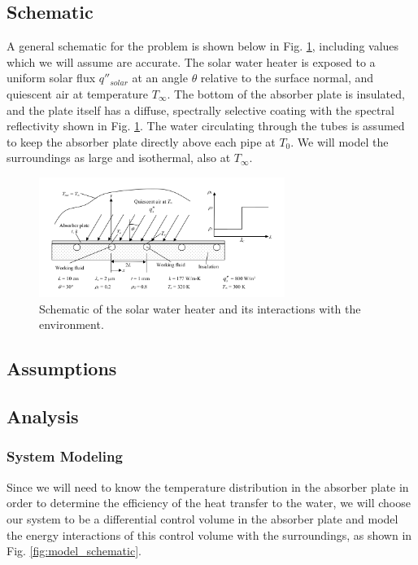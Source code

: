 \documentclass[]{report}
\begin{document}
\subsection{Schematic}

A general schematic for the problem is shown below in Fig. \ref{fig:base_schematic}, including values which we will assume are accurate. The solar water heater is exposed to a uniform solar flux $q''_{solar}$ at an angle $\theta$ relative to the surface normal, and quiescent air at temperature $T_{\infty}$. The bottom of the absorber plate is insulated, and the plate itself has a diffuse, spectrally selective coating with the spectral reflectivity shown in Fig. \ref{fig:base_schematic}. The water circulating through the tubes is assumed to keep the absorber plate directly above each pipe at $T_0$. We will model the surroundings as large and isothermal, also at $T_{\infty}$.

\begin{figure}[h]
	\centering
	\includegraphics[width=8cm]{schematic1.png}
	\caption{Schematic of the solar water heater and its interactions with the environment.}
	\label{fig:base_schematic}
\end{figure}

\subsection{Assumptions}

\subsection{Analysis}

\subsubsection{System Modeling}

Since we will need to know the temperature distribution in the absorber plate in order to determine the efficiency of the heat transfer to the water, we will choose our system to be a differential control volume in the absorber plate and model the energy interactions of this control volume with the surroundings, as shown in Fig. \ref{fig:model_schematic}.
\end{document}
